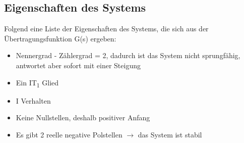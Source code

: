 \subsection{Eigenschaften des Systems}

Folgend eine Liste der Eigenschaften des Systems, die sich aus der Übertragungsfunktion G(s) ergeben:
\begin{itemize}
	\item Nennergrad - Zählergrad = 2, dadurch ist das System nicht sprungfähig, antwortet aber sofort mit einer Steigung
	\item Ein IT\textsubscript{1} Glied
	\item I Verhalten
	\item Keine Nullstellen, deshalb positiver Anfang
	\item Es gibt 2 reelle negative Polstellen $\rightarrow$ das System ist stabil
\end{itemize}